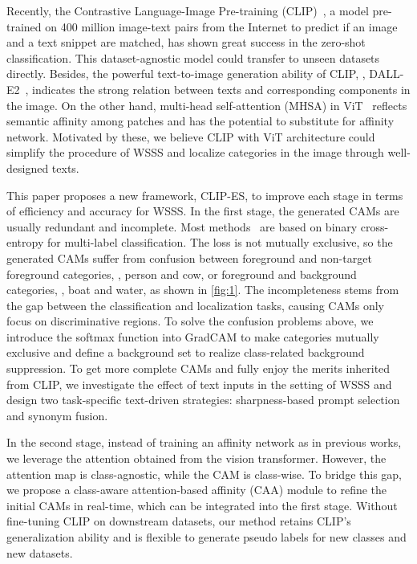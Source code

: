 \documentclass[10pt,twocolumn,letterpaper]{article}
\begin{document}
Recently, the Contrastive Language-Image Pre-training (CLIP)~\cite{CLIP}, a model pre-trained on 400 million image-text pairs from the Internet to predict if an image and a text snippet are matched, has shown great success in the zero-shot classification. This dataset-agnostic model could transfer to unseen datasets directly. Besides, the powerful text-to-image generation ability of CLIP, \ie, DALL-E2~\cite{ramesh2022dalle2}, indicates the strong relation between texts and corresponding components in the image. On the other hand, multi-head self-attention (MHSA) in ViT~\cite{dosovitskiy2020vit} 
reflects semantic affinity among patches and has the potential to substitute for affinity network. Motivated by these, we believe CLIP with ViT architecture could simplify the procedure of WSSS and localize categories in the image through well-designed texts.


This paper proposes a new framework, CLIP-ES, to improve each stage in terms of efficiency and accuracy for WSSS.
In the first stage, the generated CAMs are usually redundant and incomplete. Most methods~\cite{Wang2020SEAM, Wu2021EmbeddedDA} are based on binary cross-entropy for multi-label classification. The loss is not mutually exclusive, so the generated CAMs suffer from confusion between foreground and non-target foreground categories, \eg, person and cow, or foreground and background categories, \eg, boat and water, as shown in \cref{fig:1}. The incompleteness stems from the gap between the classification and localization tasks, causing CAMs only focus on discriminative regions. To solve the confusion problems above, we introduce the softmax function into GradCAM to make categories mutually exclusive and define a background set to realize class-related background suppression. To get more complete CAMs and fully enjoy the merits inherited from CLIP, we investigate the effect of text inputs in the setting of WSSS and design two task-specific text-driven strategies: sharpness-based prompt selection and synonym fusion. 

In the second stage, instead of training an affinity network as in previous works, we leverage the attention obtained from the vision transformer. However, the attention map is class-agnostic, while the CAM is class-wise. To bridge this gap, we propose a class-aware attention-based affinity (CAA) module to refine the initial CAMs in real-time, which can be integrated into the first stage. Without fine-tuning CLIP on downstream datasets, our method retains CLIP’s generalization ability and is flexible to generate pseudo labels for new classes and new datasets.
\end{document}
